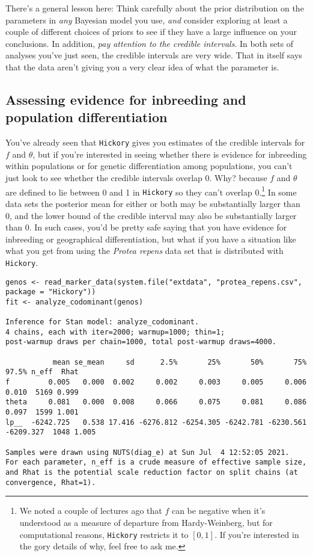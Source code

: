 There's a general lesson here: Think carefully about the prior
distribution on the parameters in {\it any\/} Bayesian model you use,
{\it and\/} consider exploring at least a couple of different choices
of priors to see if they have a large influence on your
conclusions. In addition, {\it pay attention to the credible
  intervals}. In both sets of analyses you've just seen, the credible
intervals are very wide. That in itself says that the data aren't
giving you a very clear idea of what the parameter is.

\subsection*{Assessing evidence for inbreeding and population
  differentiation}

You've already seen that {\tt Hickory} gives you estimates of the
credible intervals for $f$ and $\theta$, but if you're interested in
seeing whether there is evidence for inbreeding within populations or
for genetic differentiation among populations, you can't just look to
see whether the credible intervals overlap $0$. Why? because $f$ and
$\theta$ are defined to lie between 0 and 1 in {\tt Hickory} so they
can't overlap 0.\footnote{We noted a couple of lectures ago that $f$
  can be negative when it's understood as a measure of departure from
  Hardy-Weinberg, but for computational reasons, {\tt Hickory}
  restricts it to $[0,1]$. If you're interested in the gory details of
  why, feel free to ask me.} In some data sets the posterior mean for
either or both may be substantially larger than 0, and the lower bound
of the credible interval may also be substantially larger than 0. In
such cases, you'd be pretty safe saying that you have evidence for
inbreeding or geographical differentiation, but what if you have a
situation like what you get from using the {\it Protea repens\/} data
set that is distributed with {\tt Hickory}.

{\small
\begin{verbatim}
genos <- read_marker_data(system.file("extdata", "protea_repens.csv", package = "Hickory"))
fit <- analyze_codominant(genos)

Inference for Stan model: analyze_codominant.
4 chains, each with iter=2000; warmup=1000; thin=1; 
post-warmup draws per chain=1000, total post-warmup draws=4000.

           mean se_mean     sd      2.5%       25%       50%       75%     97.5% n_eff  Rhat
f         0.005   0.000  0.002     0.002     0.003     0.005     0.006     0.010  5169 0.999
theta     0.081   0.000  0.008     0.066     0.075     0.081     0.086     0.097  1599 1.001
lp__  -6242.725   0.538 17.416 -6276.812 -6254.305 -6242.781 -6230.561 -6209.327  1048 1.005

Samples were drawn using NUTS(diag_e) at Sun Jul  4 12:52:05 2021.
For each parameter, n_eff is a crude measure of effective sample size,
and Rhat is the potential scale reduction factor on split chains (at 
convergence, Rhat=1).
\end{verbatim}
}

